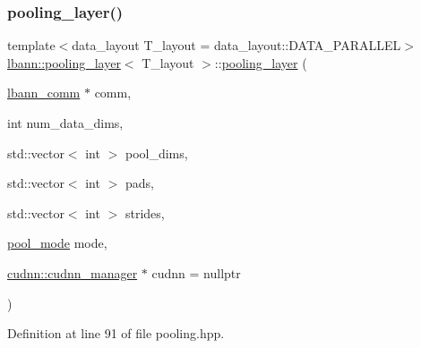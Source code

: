 \subsubsection{\texorpdfstring{pooling\+\_\+layer()}{pooling\_layer()}\hspace{0.1cm}{\footnotesize\ttfamily [2/3]}}
{\footnotesize\ttfamily template$<$data\+\_\+layout T\+\_\+layout = data\+\_\+layout\+::\+D\+A\+T\+A\+\_\+\+P\+A\+R\+A\+L\+L\+EL$>$ \\
\hyperlink{classlbann_1_1pooling__layer}{lbann\+::pooling\+\_\+layer}$<$ T\+\_\+layout $>$\+::\hyperlink{classlbann_1_1pooling__layer}{pooling\+\_\+layer} (\begin{DoxyParamCaption}\item[{\hyperlink{classlbann_1_1lbann__comm}{lbann\+\_\+comm} $\ast$}]{comm,  }\item[{int}]{num\+\_\+data\+\_\+dims,  }\item[{std\+::vector$<$ int $>$}]{pool\+\_\+dims,  }\item[{std\+::vector$<$ int $>$}]{pads,  }\item[{std\+::vector$<$ int $>$}]{strides,  }\item[{\hyperlink{base_8hpp_ac47a6ee5278a53898222a48639a2bf39}{pool\+\_\+mode}}]{mode,  }\item[{\hyperlink{classlbann_1_1cudnn_1_1cudnn__manager}{cudnn\+::cudnn\+\_\+manager} $\ast$}]{cudnn = {\ttfamily nullptr} }\end{DoxyParamCaption})\hspace{0.3cm}{\ttfamily [inline]}}



Definition at line 91 of file pooling.\+hpp.


